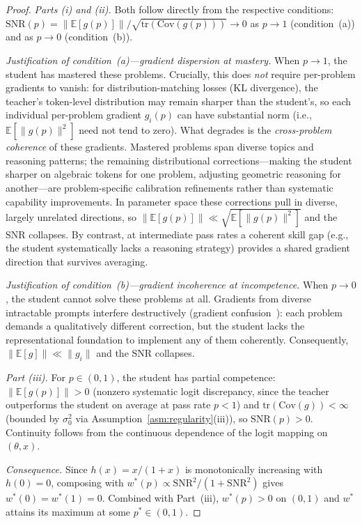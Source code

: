 \documentclass{article}
\begin{document}
\begin{proof}
\emph{Parts (i) and (ii).} Both follow directly from the respective conditions: $\text{SNR}(p) = \|\mathbb{E}[g(p)]\| / \sqrt{\text{tr}(\text{Cov}(g(p)))} \to 0$ as $p \to 1$ (condition~(a)) and as $p \to 0$ (condition~(b)).

\emph{Justification of condition~(a)---gradient dispersion at mastery.}
When $p \to 1$, the student has mastered these problems. Crucially, this does \emph{not} require per-problem gradients to vanish: for distribution-matching losses (KL divergence), the teacher's token-level distribution may remain sharper than the student's, so each individual per-problem gradient $g_i(p)$ can have substantial norm (i.e., $\mathbb{E}[\|g(p)\|^2]$ need not tend to zero). What degrades is the \emph{cross-problem coherence} of these gradients. Mastered problems span diverse topics and reasoning patterns; the remaining distributional corrections---making the student sharper on algebraic tokens for one problem, adjusting geometric reasoning for another---are problem-specific calibration refinements rather than systematic capability improvements. In parameter space these corrections pull in diverse, largely unrelated directions, so $\|\mathbb{E}[g(p)]\| \ll \sqrt{\mathbb{E}[\|g(p)\|^2]}$ and the SNR collapses. By contrast, at intermediate pass rates a coherent skill gap (e.g., the student systematically lacks a reasoning strategy) provides a shared gradient direction that survives averaging.

\emph{Justification of condition~(b)---gradient incoherence at incompetence.}
When $p \to 0$, the student cannot solve these problems at all. Gradients from diverse intractable prompts interfere destructively (gradient confusion~\citep{sankararaman2020gradient, yu2020gradient}): each problem demands a qualitatively different correction, but the student lacks the representational foundation to implement any of them coherently. Consequently, $\|\mathbb{E}[g]\| \ll \|g_i\|$ and the SNR collapses.

\emph{Part (iii).} For $p \in (0,1)$, the student has partial competence: $\|\mathbb{E}[g(p)]\| > 0$ (nonzero systematic logit discrepancy, since the teacher outperforms the student on average at pass rate $p < 1$) and $\text{tr}(\text{Cov}(g)) < \infty$ (bounded by $\sigma_0^2$ via Assumption~\ref{asm:regularity}(iii)), so $\text{SNR}(p) > 0$. Continuity follows from the continuous dependence of the logit mapping on $(\theta, x)$.

\emph{Consequence.} Since $h(x) = x/(1+x)$ is monotonically increasing with $h(0) = 0$, composing with $w^*(p) \propto \text{SNR}^2/(1+\text{SNR}^2)$ gives $w^*(0) = w^*(1) = 0$. Combined with Part~(iii), $w^*(p) > 0$ on $(0,1)$ and $w^*$ attains its maximum at some $p^* \in (0,1)$.
\end{proof}
\end{document}
